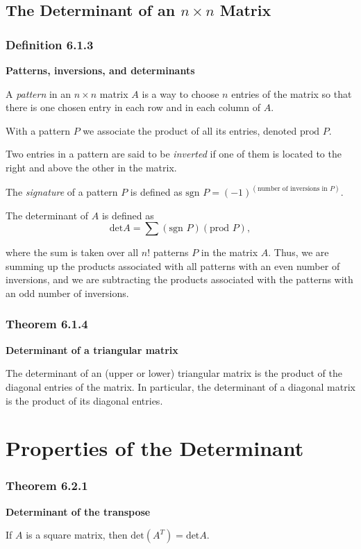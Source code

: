 \documentclass{report}
\begin{document}
\subsection*{The Determinant of an $n\times{}n$ Matrix}
\subsubsection*{Definition 6.1.3}
\par\noindent\textbf{Patterns, inversions, and determinants}
\par\noindent A \textit{pattern} in an $n\times{}n$ matrix $A$ is a way to choose $n$ entries of the matrix so that there is one chosen entry in each row and in each column of $A$.
\par\noindent With a pattern $P$ we associate the product of all its entries, denoted $\textrm{prod }P$.
\par\noindent Two entries in a pattern are said to be \textit{inverted} if one of them is located to the right and above the other in the matrix.
\par\noindent The \textit{signature} of a pattern $P$ is defined as $\textrm{sgn }P=(-1)^{(\textrm{number of inversions in }P)}$.
\par\noindent The determinant of $A$ is defined as
\[\textrm{det}A=\sum{}(\textrm{sgn }P)(\textrm{prod }P),\]
\par\noindent where the sum is taken over all $n!$ patterns $P$ in the matrix $A$. Thus, we are summing up the products associated with all patterns with an even number of inversions, and we are subtracting the products associated with the patterns with an odd number of inversions.
\subsubsection*{Theorem 6.1.4}
\par\noindent\textbf{Determinant of a triangular matrix}
\par\noindent The determinant of an (upper or lower) triangular matrix is the product of the diagonal entries of the matrix. In particular, the determinant of a diagonal matrix is the product of its diagonal entries.

\section{Properties of the Determinant}
\subsubsection*{Theorem 6.2.1}
\par\noindent\textbf{Determinant of the transpose}
\par\noindent If $A$ is a square matrix, then $\displaystyle \textrm{det}(A^{T})=\textrm{det}A$.
\end{document}
